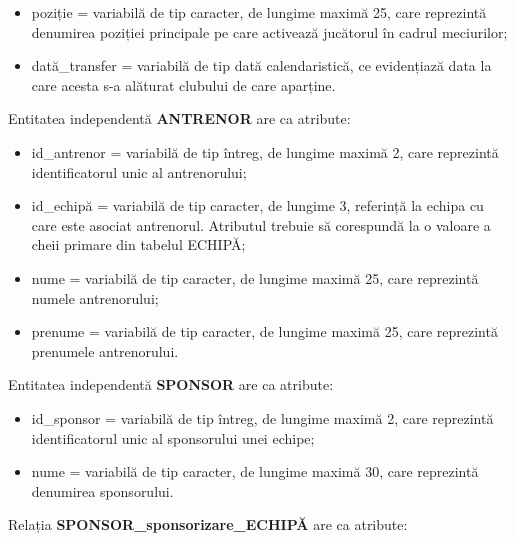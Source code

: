 \documentclass{article}
\begin{document}
\begin{spacing}{1.1}
\begin{itemize}
		\item poziție = variabilă de tip caracter, de lungime maximă 25, care reprezintă denumirea poziției principale pe care activează jucătorul în cadrul meciurilor;
		
		\item dată\_transfer =  variabilă de tip dată calendaristică, ce evidențiază data la care acesta s-a alăturat clubului de care aparține.
	\end{itemize}
	
	\vspace{0.3cm}
	
	Entitatea independentă \textbf{ANTRENOR} are ca atribute:  
	
	\begin{itemize}
		\item id\_antrenor = variabilă de tip întreg, de lungime maximă 2, care reprezintă identificatorul unic al antrenorului;
		
		\item id\_echipă = variabilă de tip caracter, de lungime 3, referință la echipa cu care este asociat antrenorul. Atributul trebuie să corespundă la o valoare a cheii primare din tabelul ECHIPĂ;
		
		\item nume = variabilă de tip caracter, de lungime maximă 25, care reprezintă numele antrenorului;
		
		\item prenume = variabilă de tip caracter, de lungime maximă 25, care reprezintă prenumele antrenorului.
	\end{itemize}
	
	\vspace{0.3cm}
	
	Entitatea independentă \textbf{SPONSOR} are ca atribute:

	\begin{itemize}
		\item id\_sponsor = variabilă de tip întreg, de lungime maximă 2, care reprezintă identificatorul unic al sponsorului unei echipe;
		
		\item nume = variabilă de tip caracter, de lungime maximă 30, care reprezintă denumirea sponsorului.
	\end{itemize}
	
	\vspace{0.3cm}
	
	Relația \textbf{SPONSOR\_sponsorizare\_ECHIPĂ} are ca atribute:
	

\end{spacing}
\end{document}
